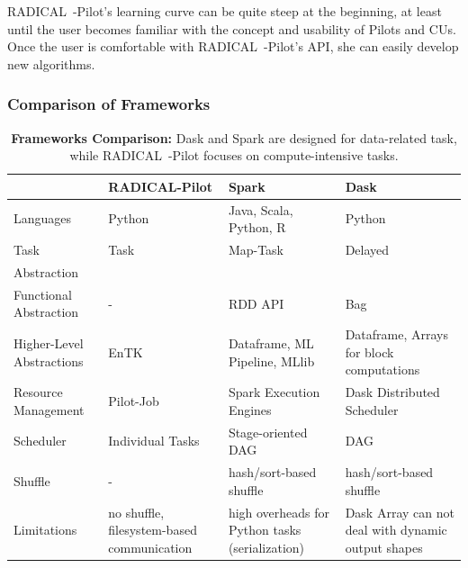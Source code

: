 RADICAL~-Pilot's learning curve can be quite steep at the beginning, at least until the user becomes familiar with the concept and usability of Pilots and CUs.
Once the user is comfortable with RADICAL~-Pilot's API, she can easily develop new algorithms.

\subsubsection{Comparison of Frameworks}
\begin{table}[t]
    \begin{tabular}{@{}p{2.75cm}|p{3.25cm}p{3.25cm}p{3.25cm}@{}}
        \toprule
        &\textbf{RADICAL-Pilot} &
        \textbf{Spark} &
        \textbf{Dask} \\
        \midrule
        Languages &
        Python &
        Java, Scala, Python, R &
        Python\\
        Task &
        Task &
        Map-Task &
        Delayed\\
        Abstraction &
        &
        & \\
        Functional Abstraction  &
        - &
        RDD API &
        Bag\\
        Higher-Level Abstractions &
        EnTK~\cite{balasubramanian2018harnessing} &
        Dataframe, ML Pipeline, MLlib~\cite{meng2016mllib} &
        Dataframe, Arrays for block computations\\
        Resource Management &
        Pilot-Job &
        Spark Execution Engines &
        Dask Distributed Scheduler\\
        Scheduler    &
        Individual Tasks &
        Stage-oriented DAG &
        DAG\\
        Shuffle      &
        -       &
        hash/sort-based shuffle &
        hash/sort-based shuffle\\
        Limitations &
        no shuffle, filesystem-based communication  &
        high overheads for Python tasks (serialization)   &
        Dask Array can not deal with dynamic output shapes\\
        \bottomrule
    \end{tabular}
    \caption{\textbf{Frameworks Comparison:} Dask and Spark are designed for data-related task, while RADICAL~-Pilot focuses on compute-intensive tasks.\label{tab:frameworks}}
\end{table}

